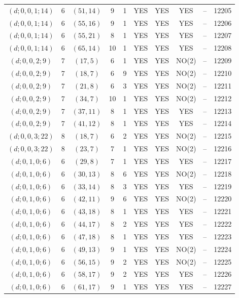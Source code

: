\begin{longtable}{|c|c|c|c|c|c|c|c|c|c|}
$(d; 0, 0, 1; 14)$ & 6 & $(51, 14)$ & 9 & 1 & YES & YES & YES & -- & 12205\\
$(d; 0, 0, 1; 14)$ & 6 & $(55, 16)$ & 9 & 1 & YES & YES & YES & -- & 12206\\
$(d; 0, 0, 1; 14)$ & 6 & $(55, 21)$ & 8 & 1 & YES & YES & YES & -- & 12207\\
$(d; 0, 0, 1; 14)$ & 6 & $(65, 14)$ & 10 & 1 & YES & YES & YES & -- & 12208\\
$(d; 0, 0, 2; 9)$ & 7 & $(17, 5)$ & 6 & 1 & YES & YES & NO(2) & -- & 12209\\
$(d; 0, 0, 2; 9)$ & 7 & $(18, 7)$ & 6 & 9 & YES & YES & NO(2) & -- & 12210\\
$(d; 0, 0, 2; 9)$ & 7 & $(21, 8)$ & 6 & 3 & YES & YES & NO(2) & -- & 12211\\
$(d; 0, 0, 2; 9)$ & 7 & $(34, 7)$ & 10 & 1 & YES & YES & NO(2) & -- & 12212\\
$(d; 0, 0, 2; 9)$ & 7 & $(37, 11)$ & 8 & 1 & YES & YES & YES & -- & 12213\\
$(d; 0, 0, 2; 9)$ & 7 & $(41, 12)$ & 8 & 1 & YES & YES & YES & -- & 12214\\
$(d; 0, 0, 3; 22)$ & 8 & $(18, 7)$ & 6 & 2 & YES & YES & NO(2) & -- & 12215\\
$(d; 0, 0, 3; 22)$ & 8 & $(23, 7)$ & 7 & 1 & YES & YES & NO(2) & -- & 12216\\
$(d; 0, 1, 0; 6)$ & 6 & $(29, 8)$ & 7 & 1 & YES & YES & YES & -- & 12217\\
$(d; 0, 1, 0; 6)$ & 6 & $(30, 13)$ & 8 & 6 & YES & YES & NO(2) & -- & 12218\\
$(d; 0, 1, 0; 6)$ & 6 & $(33, 14)$ & 8 & 3 & YES & YES & YES & -- & 12219\\
$(d; 0, 1, 0; 6)$ & 6 & $(42, 11)$ & 9 & 6 & YES & YES & NO(2) & -- & 12220\\
$(d; 0, 1, 0; 6)$ & 6 & $(43, 18)$ & 8 & 1 & YES & YES & YES & -- & 12221\\
$(d; 0, 1, 0; 6)$ & 6 & $(44, 17)$ & 8 & 2 & YES & YES & YES & -- & 12222\\
$(d; 0, 1, 0; 6)$ & 6 & $(47, 18)$ & 8 & 1 & YES & YES & YES & -- & 12223\\
$(d; 0, 1, 0; 6)$ & 6 & $(49, 13)$ & 9 & 1 & YES & YES & NO(2) & -- & 12224\\
$(d; 0, 1, 0; 6)$ & 6 & $(56, 15)$ & 9 & 2 & YES & YES & NO(2) & -- & 12225\\
$(d; 0, 1, 0; 6)$ & 6 & $(58, 17)$ & 9 & 2 & YES & YES & YES & -- & 12226\\
$(d; 0, 1, 0; 6)$ & 6 & $(61, 17)$ & 9 & 1 & YES & YES & YES & -- & 12227\\

\end{longtable}
